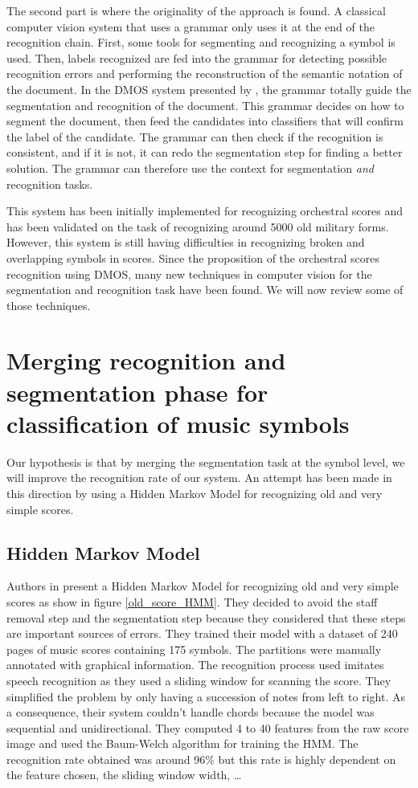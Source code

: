 \documentclass[11pt]{sdm}
\begin{document}
The second part is where the originality of the approach is found.
A classical computer vision system that uses a grammar only uses it at the end of the recognition chain.
First, some tools for segmenting and recognizing a symbol is used.
Then, labels recognized are fed into the grammar for detecting possible recognition errors and performing the reconstruction of the semantic notation of the document.
In the DMOS system presented by \cite{couasnon_dmos_2001}, the grammar totally guide the segmentation and recognition of the document.
This grammar decides on how to segment the document, then feed the candidates into classifiers that will confirm the label of the candidate.
The grammar can then check if the recognition is consistent, and if it is not, it can redo the segmentation step for finding a better solution.
The grammar can therefore use the context for segmentation \textit{and} recognition tasks.

This system has been initially implemented for recognizing orchestral scores and has been validated on the task of recognizing around 5000 old military forms.
However, this system is still having difficulties in recognizing broken and overlapping symbols in scores.
Since the proposition of the orchestral scores recognition using DMOS, many new techniques in computer vision for the segmentation and recognition task have been found.
We will now review some of those techniques.

\section{Merging recognition and segmentation phase for classification of music symbols}

Our hypothesis is that by merging the segmentation task at the symbol level, we will improve the recognition rate of our system.
An attempt has been made in this direction by using a Hidden Markov Model for recognizing old and very simple scores.

\subsection{Hidden Markov Model} \label{ssec:HMM}

Authors in \cite{pugin_optical_2006} present a Hidden Markov Model for recognizing old and very simple scores as show in figure \ref{old_score_HMM}.
They decided to avoid the staff removal step and the segmentation step because they considered that these steps are important sources of errors.
They trained their model with a dataset of 240 pages of music scores containing 175 symbols.
The partitions were manually annotated with graphical information.
The recognition process used imitates speech recognition as they used a sliding window for scanning the score.
They simplified the problem by only having a succession of notes from left to right.
As a consequence, their system couldn't handle chords because the model was sequential and unidirectional.
They computed 4 to 40 features from the raw score image and used the Baum-Welch algorithm for training the HMM.
The recognition rate obtained was around 96\% but this rate is highly dependent on the feature chosen, the sliding window width, \ldots
\end{document}
